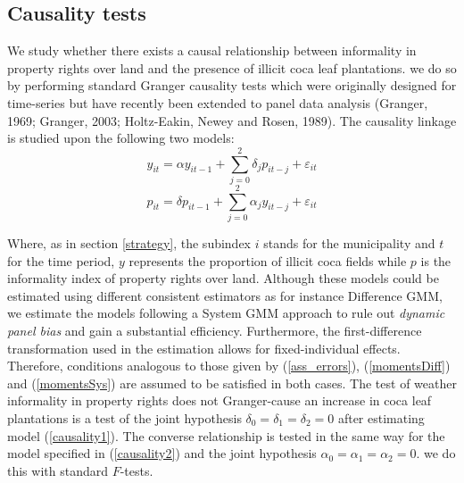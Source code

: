 \subsection{Causality tests}
\label{causalitytests}

We study whether there exists a causal relationship between informality in property rights over land and the presence of illicit coca leaf plantations. we do so by performing standard Granger causality tests which were originally designed for time-series but have recently been extended to panel data analysis (Granger, 1969; Granger, 2003; Holtz-Eakin, Newey and Rosen, 1989). The causality linkage is studied upon the following two models:
\begin{equation}
\label{causality1}
y_{it}=\alpha y_{it-1}+\sum\limits_{j=0}^{2} \delta_j p_{it-j} + \varepsilon_{it}
\end{equation}
\begin{equation}
\label{causality2}
p_{it}=\delta p_{it-1}+\sum\limits_{j=0}^{2} \alpha_j y_{it-j} + \varepsilon_{it}
\end{equation}

Where, as in section \ref{strategy}, the subindex $i$ stands for the municipality and $t$ for the time period, $y$ represents the proportion of illicit coca fields while $p$ is the informality index of property rights over land. Although these models could be estimated using different consistent estimators as for instance Difference GMM, we estimate the models following a System GMM approach to rule out \emph{dynamic panel bias} and gain a substantial efficiency. Furthermore, the first-difference transformation used in the estimation allows for fixed-individual effects. Therefore, conditions analogous to those given by (\ref{ass_errors}), (\ref{momentsDiff}) and (\ref{momentsSys}) are assumed to be satisfied in both cases. The test of weather informality in property rights does not Granger-cause an increase in coca leaf plantations is a test of the joint hypothesis $\delta_0=\delta_1=\delta_2=0$ after estimating model (\ref{causality1}). The converse relationship is tested in the same way for the model specified in (\ref{causality2}) and the joint hypothesis $\alpha_0=\alpha_1=\alpha_2=0$. we do this with standard $F$-tests.

